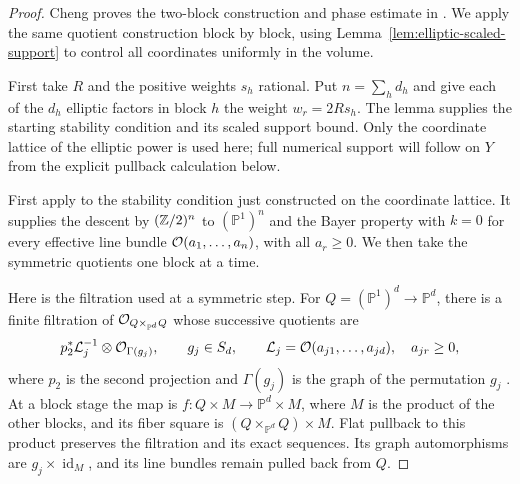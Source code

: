 \begin{proof}
Cheng proves the two-block construction and phase estimate in
\cite[Proposition~4.3 and Remark~4.4]{Cheng2026}.  We apply the same
quotient construction block by block, using
Lemma~\ref{lem:elliptic-scaled-support} to control all coordinates
uniformly in the volume.

First take $R$ and the positive weights $s_h$ rational.  Put
$n=\sum_hd_h$ and give
each of the $d_h$ elliptic factors in block $h$ the weight
$w_r=2Rs_h$.  The lemma supplies the starting stability condition and
its scaled support bound.  Only the coordinate lattice of the elliptic
power is used here; full numerical support will follow on $Y$ from the
explicit pullback calculation below.

First apply \cite[Proposition~5.1]{LiEtAl2026} to the stability condition
just constructed on the coordinate lattice.  It supplies the descent
by $(\mathbb Z/2)^n$ to $(\mathbb P^1)^n$ and the Bayer property with $k=0$
for every effective line bundle $\mathcal O(a_1,\ldots,a_n)$, with all $a_r\ge0$.
We then take the symmetric quotients one block at a time.

Here is the filtration used at a symmetric step.  For
$Q=(\mathbb P^1)^d\to\mathbb P^d$, there is a finite filtration of
$\mathcal O_{Q\times_{\mathbb P^d}Q}$ whose successive quotients are
\[
 p_2^*\mathcal L_j^{-1}\otimes\mathcal O_{\Gamma(g_j)},
 \qquad g_j\in S_d,\qquad
 \mathcal L_j=\mathcal O(a_{j1},\ldots,a_{jd}),\quad a_{jr}\ge0,
\]
where $p_2$ is the second projection and $\Gamma(g_j)$ is the graph
of the permutation $g_j$
\cite[Definition~3.19 and Example~3.20(3)]{LiEtAl2026}.
At a block stage the map is $f:Q\times M\to\mathbb P^d\times M$,
where $M$ is the product of the other blocks, and its fiber square is
$(Q\times_{\mathbb P^d}Q)\times M$.
Flat pullback to this product preserves the filtration and its exact
sequences.  Its graph automorphisms are $g_j\times\operatorname{id}_M$,
and its line bundles remain pulled back from $Q$.


\end{proof}

